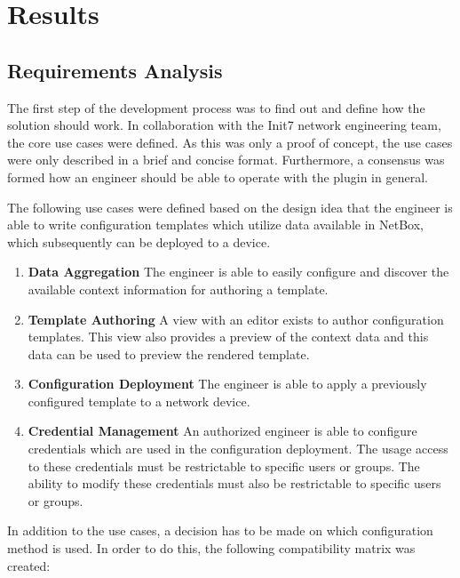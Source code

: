 \chapter{\label{results}Results}
\thispagestyle{fancy}

\section{Requirements Analysis}

The first step of the development process was to find out and define
how the solution should work. In collaboration with the Init7 network
engineering team, the core use cases were defined. As this was only
a proof of concept, the use cases were only described in a brief and
concise format. Furthermore, a consensus was formed how an engineer
should be able to operate with the plugin in general.

The following use cases were defined based on the design idea that
the engineer is able to write configuration templates which utilize data
available in NetBox, which subsequently can be deployed to a device.

\begin{enumerate}[label=U.\arabic*]
  \item{\label{uc-agg}} \textbf{Data Aggregation} 
  The engineer is able to easily configure and discover the available
  context information for authoring a template.
  \item{\label{uc-tmpl}} \textbf{Template Authoring}
  A view with an editor exists to author configuration templates.
  This view also provides a preview of the context data and this data
  can be used to preview the rendered template.
  \item{\label{uc-appl}} \textbf{Configuration Deployment}
  The engineer is able to apply a previously configured template
  to a network device.
  \item{\label{uc-cred}} \textbf{Credential Management}
  An authorized engineer is able to configure credentials which are used
  in the configuration deployment. The usage access to these credentials must
  be restrictable to specific users or groups. The ability to modify these
  credentials must also be restrictable to specific users or groups.
\end{enumerate}

In addition to the use cases, a decision has to be made on which
configuration method is used. In order to do this, the following compatibility
matrix was created:

